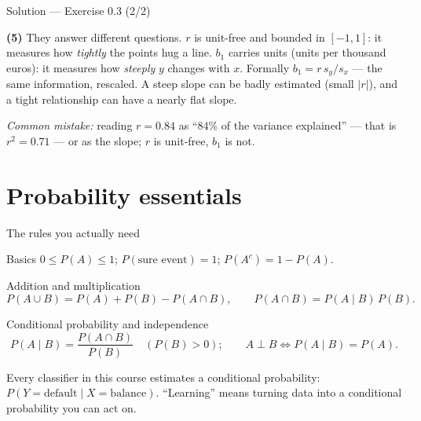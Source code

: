 \documentclass[aspectratio=169,11pt]{beamer}
\begin{document}
\begin{frame}{Solution --- Exercise 0.3 (2/2)}
  \begin{solutionbox}
    \textbf{(5)} They answer different questions. $r$ is unit-free and
    bounded in $[-1,1]$: it measures how \emph{tightly} the points hug a
    line. $b_1$ carries units (units per thousand euros): it measures how
    \emph{steeply} $y$ changes with $x$. Formally $b_1 = r\,s_y/s_x$ --- the
    same information, rescaled. A steep slope can be badly estimated
    (small $|r|$), and a tight relationship can have a nearly flat slope.

    \textit{Common mistake:} reading $r = 0.84$ as ``$84\%$ of the variance
    explained'' --- that is $r^2 = 0.71$ --- or as the slope; $r$ is
    unit-free, $b_1$ is not.
  \end{solutionbox}
\end{frame}


\section[Probability]{Probability essentials}

\begin{frame}{The rules you actually need}
  \footnotesize
  \begin{block}{Basics}
    $0 \le P(A) \le 1$; \quad $P(\text{sure event}) = 1$; \quad
    $P(A^c) = 1 - P(A)$.
  \end{block}
  \begin{block}{Addition and multiplication}
    \[
      P(A \cup B) = P(A) + P(B) - P(A \cap B),
      \qquad
      P(A \cap B) = P(A \mid B)\,P(B).
    \]
  \end{block}
  \begin{block}{Conditional probability and independence}
    \[
      P(A \mid B) = \frac{P(A \cap B)}{P(B)} \quad (P(B) > 0);
      \qquad
      A \perp B \iff P(A \mid B) = P(A).
    \]
  \end{block}
  \begin{takeaway}
    Every classifier in this course estimates a conditional probability:
    $P(Y = \text{default} \mid X = \text{balance})$. ``Learning'' means
    turning data into a conditional probability you can act on.
  \end{takeaway}
\end{frame}
\end{document}
